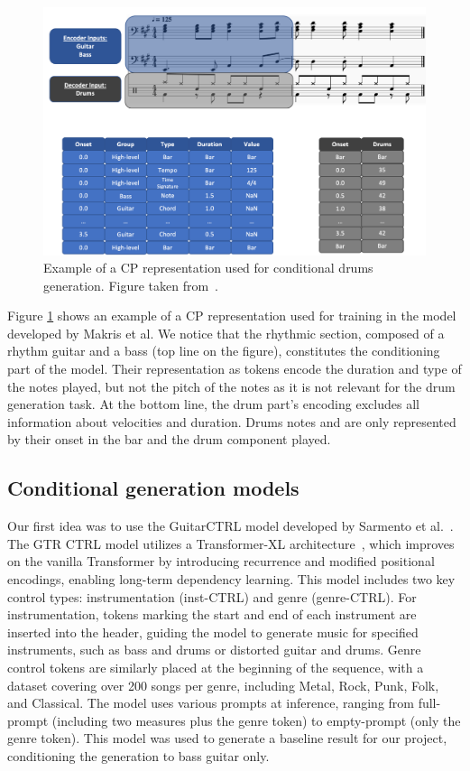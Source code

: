 \begin{figure}[!h]
    \centering
    \includegraphics[width=.9\linewidth]{../images-figures/tokenization_makris.png}
    \caption{Example of a CP representation used for conditional drums generation. Figure taken from~\cite{makris_conditional_2022}.}
    \label{fig:compound_gen_tokenization}
\end{figure}


Figure \ref{fig:compound_gen_tokenization} shows an example of a CP representation used for training in the model developed by Makris et al.
We notice that the rhythmic section, composed of a rhythm guitar and a bass (top line on the figure), constitutes the conditioning part of the model.
Their representation as tokens encode the duration and type of the notes played, but not the pitch of the notes as it is not relevant for the drum generation task.
At the bottom line, the drum part's encoding excludes all information about velocities and duration.
Drums notes and are only represented by their onset in the bar and the drum component played.

\subsection{Conditional generation models}

Our first idea was to use the GuitarCTRL model developed by Sarmento et al.~\cite{sarmento_gtr-ctrl_2023}.
The GTR CTRL model utilizes a Transformer-XL architecture~\cite{dai_transformer-xl_2019}, which improves on the vanilla Transformer by introducing recurrence and modified positional encodings, enabling long-term dependency learning.
This model includes two key control types: instrumentation (inst-CTRL) and genre (genre-CTRL).
For instrumentation, tokens marking the start and end of each instrument are inserted into the header, guiding the model to generate music for specified instruments, such as bass and drums or distorted guitar and drums.
Genre control tokens are similarly placed at the beginning of the sequence, with a dataset covering over 200 songs per genre, including Metal, Rock, Punk, Folk, and Classical.
The model uses various prompts at inference, ranging from full-prompt (including two measures plus the genre token) to empty-prompt (only the genre token).
This model was used to generate a baseline result for our project, conditioning the generation to bass guitar only.


